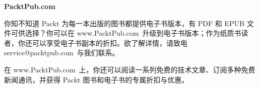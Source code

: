 \vspace{27.5bp}
{\sffamily\bfseries\fontsize{20bp}{23bp}\selectfont PacktPub.com\par}
\vspace{5.6bp}
{\fontsize{10.5bp}{12.6bp}\selectfont
\noindent 你知不知道 Packt 为每一本出版的图书都提供电子书版本，有 PDF 和 EPUB 文件可供选择？你可以在 {\idxnumfont\fontsize{9bp}{12.6bp}\selectfont www.PacktPub.com}\ 升级到电子书版本；作为纸质书读者，你还可以享受电子书副本的折扣。欲了解详情，请致电 {\idxnumfont\fontsize{9bp}{12.6bp}\selectfont service@packtpub.com}\ 与我们联系。\par
\vspace{15bp}
\noindent 在 {\idxnumfont\fontsize{9bp}{12.6bp}\selectfont www.PacktPub.com}\ 上，你还可以阅读一系列免费的技术文章、订阅多种免费新闻通讯，并获得 Packt 图书和电子书的专属折扣与优惠。\par}
\endgroup
